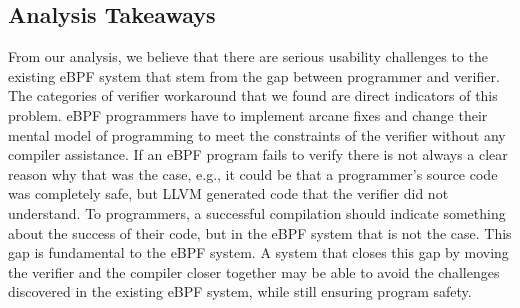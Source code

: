 %


\subsection{Analysis Takeaways}
From our analysis, we believe that there are serious usability challenges to the
    existing eBPF system that stem from the gap between programmer and verifier.
The categories of verifier workaround that we found are direct indicators of this problem.
eBPF programmers have to implement arcane fixes and change their mental model of
    programming to meet the constraints of the verifier without any compiler assistance.
If an eBPF program fails to verify there is not always a clear reason why that was the case, e.g.,
it could be that a programmer's source code was completely safe, but LLVM generated code that the verifier did not understand.
To programmers, a successful compilation should indicate something about the success of their code, but in the eBPF system that is not the case.
This gap is fundamental to the eBPF system.
A system that closes this gap by moving the verifier and the compiler closer together may be able to avoid the challenges discovered in the existing eBPF system, while still ensuring program safety.

